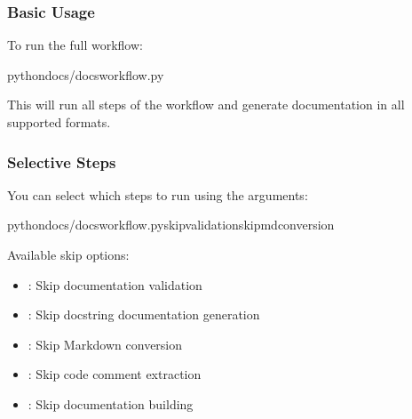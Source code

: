 \documentclass[letterpaper,10pt,english]{sphinxmanual}
\begin{document}
\subsubsection{Basic Usage}
\label{\detokenize{documentation_workflow:basic-usage}}
\sphinxAtStartPar
To run the full workflow:

\begin{sphinxVerbatim}[commandchars=\\\{\}]
pythondocs/docs\PYGZus{}workflow.py
\end{sphinxVerbatim}

\sphinxAtStartPar
This will run all steps of the workflow and generate documentation in all supported formats.


\subsubsection{Selective Steps}
\label{\detokenize{documentation_workflow:selective-steps}}
\sphinxAtStartPar
You can select which steps to run using the  arguments:

\begin{sphinxVerbatim}[commandchars=\\\{\}]
pythondocs/docs\PYGZus{}workflow.py\PYGZhy{}\PYGZhy{}skip\PYGZhy{}validation\PYGZhy{}\PYGZhy{}skip\PYGZhy{}md\PYGZhy{}conversion
\end{sphinxVerbatim}

\sphinxAtStartPar
Available skip options:
\begin{itemize}
\item {} 
\sphinxAtStartPar
{}: Skip documentation validation

\item {} 
\sphinxAtStartPar
{}: Skip docstring documentation generation

\item {} 
\sphinxAtStartPar
{}: Skip Markdown conversion

\item {} 
\sphinxAtStartPar
{}: Skip code comment extraction

\item {} 
\sphinxAtStartPar
{}: Skip documentation building

\end{itemize}
\end{document}
